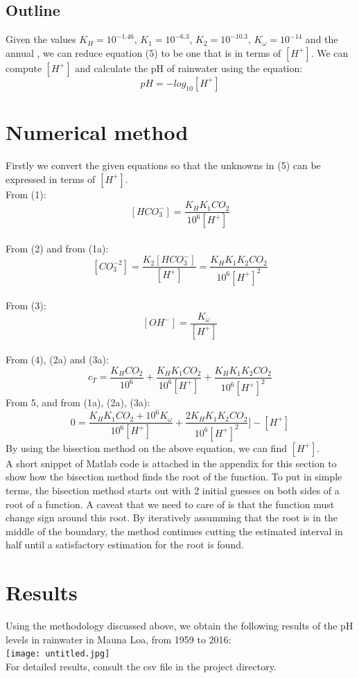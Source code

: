 \documentclass{book}
\begin{document}
	\subsection{Outline}
	Given the values ${K_H  = 10^{-1.46}}$, ${ K_1 =  10^{-6.3}}$, ${ K_2 = 10^{-10.3}}$, ${ K_\omega = 10^{-14}}$ and the annual , we can reduce equation (5) to be one that is in terms of ${[H^+]}$. We can compute ${[H^+]}$ and calculate the pH of rainwater using the equation:
	\[ pH = -log_{10}[H^+] \tag{6} \]
	
	\section{Numerical method}
	Firstly we convert the given equations so that the unknowns in (5) can be expressed in terms of ${[H^+]}$. \\
	From (1):
	\[ [HCO_3^-] = \frac{K_HK_1CO_2}{10^6[H^+]} \tag{1a} \] \\
	From (2) and from (1a):
	\[ [CO_3^{-2}] = \frac{K_2[HCO_3^-]}{[H^+]} \tag{2a} = \frac{K_HK_1K_2CO_2}{10^6[H^+]^2} \] \\
	From (3):
	\[ [OH^-] = \frac{K_\omega}{[H^+]} \tag{3a} \] \\
	From (4), (2a) and (3a):
	\[ c_T = \frac{K_HCO_2}{10^6} + \frac{K_HK_1CO_2}{10^6[H^+]} + \frac{K_HK_1K_2CO_2}{10^6[H^+]^2} \tag{4a} \]
	From 5, and from (1a), (2a), (3a):
	\[ 0 =  \frac{K_HK_1CO_2 + 10^6K_\omega}{10^6[H^+]} + \frac{2K_HK_1K_2CO_2}{10^6[H^+]^2}] - [H^+] \tag{5a} \]
	By using the bisection method on the above equation, we can find ${[H^+]}$. \\
	A short snippet of Matlab code is attached in the appendix for this section to show how the bisection method finds the root of the function. To put in simple terms, the bisection method starts out with 2 initial guesses on both sides of a root of a function. A caveat that we need to care of is that the function must change sign around this root. By iteratively assumming that the root is in the middle of the boundary, the method continues cutting the estimated interval in half until a satisfactory estimation for the root is found.
	
	\section{Results}
	Using the methodology discussed above, we obtain the following results of the pH levels in rainwater in Mauna Loa, from 1959 to 2016:\\
	\texttt{[image: untitled.jpg]} \\
	For detailed results, consult the csv file in the project directory.
	
\end{document}

